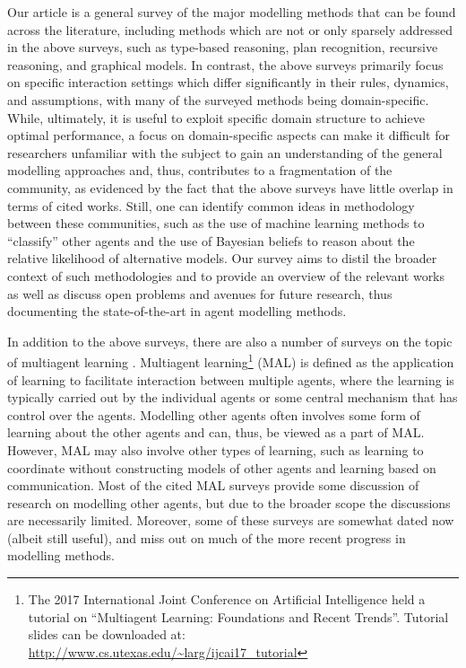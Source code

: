 \documentclass[final,1p,times,authoryear]{elsarticle}
\begin{document}
Our article is a general survey of the major modelling methods that can be found across the literature, including methods which are not or only sparsely addressed in the above surveys, such as type-based reasoning, plan recognition, recursive reasoning, and graphical models. In contrast, the above surveys primarily focus on specific interaction settings which differ significantly in their rules, dynamics, and assumptions, with many of the surveyed methods being domain-specific. While, ultimately, it is useful to exploit specific domain structure to achieve optimal performance, a focus on domain-specific aspects can make it difficult for researchers unfamiliar with the subject to gain an understanding of the general modelling approaches and, thus, contributes to a fragmentation of the community, as evidenced by the fact that the above surveys have little overlap in terms of cited works. Still, one can identify common ideas in methodology between these communities, such as the use of machine learning methods to ``classify'' other agents and the use of Bayesian beliefs to reason about the relative likelihood of alternative models. Our survey aims to distil the broader context of such methodologies and to provide an overview of the relevant works as well as discuss open problems and avenues for future research, thus documenting the state-of-the-art in agent modelling methods.

In addition to the above surveys, there are also a number of surveys on the topic of multiagent learning \citep{hkbm2017,bthk2015,tw2012,bbd2008,pl2005,adkln2001,sv2000,sw1999}. Multiagent learning\footnote{The 2017 International Joint Conference on Artificial Intelligence held a tutorial on ``Multiagent Learning: Foundations and Recent Trends''. Tutorial slides can be downloaded at: \url{http://www.cs.utexas.edu/~larg/ijcai17_tutorial}} (MAL) is defined as the application of learning to facilitate interaction between multiple agents, where the learning is typically carried out by the individual agents or some central mechanism that has control over the agents. Modelling other agents often involves some form of learning about the other agents and can, thus, be viewed as a part of MAL. However, MAL may also involve other types of learning, such as learning to coordinate without constructing models of other agents \citep[e.g.][]{ar2012,bv2002,hm2001} and learning based on communication. Most of the cited MAL surveys provide some discussion of research on modelling other agents, but due to the broader scope the discussions are necessarily limited. Moreover, some of these surveys are somewhat dated now (albeit still useful), and miss out on much of the more recent progress in modelling methods.
\end{document}
